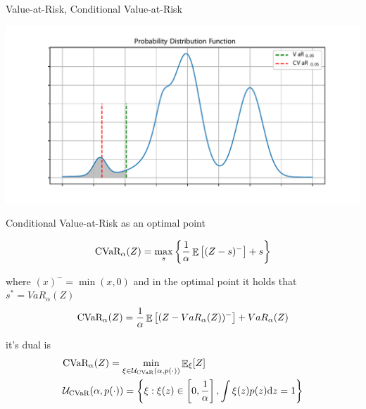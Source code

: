 \documentclass{beamer}
\begin{document}

\begin{frame}{Value-at-Risk, Conditional Value-at-Risk}

\includegraphics[width=\linewidth]{../gfx/pdf.pdf}

\end{frame}


\begin{frame}{Conditional Value-at-Risk as an optimal point}

\begin{definition}
\begin{equation*}
\text{CVaR}_\alpha(Z)= \max_s\left\lbrace \dfrac{1}{\alpha}\mathop{\mathbb{E}} \left[ (Z-s)^-\right] + s  \right\rbrace 
\end{equation*}

where $(x)^- = \min(x, 0)$ and in the optimal point it holds that $s^* = VaR_\alpha(Z)$
\begin{equation*}
\text{CVaR}_\alpha(Z)= \dfrac{1}{\alpha}\mathop{\mathbb{E}} \left[ (Z-VaR_\alpha(Z))^-\right] + VaR_\alpha(Z)
\end{equation*}



it's dual is
\newcommand{\smallenvelope}{\mathcal{U}_{\cvar}(\alpha, p(\cdot))}
\begin{align*}
&\cvar_\alpha(Z)= \min_{\xi \in \smallenvelope}\expect\nolimits_\xi[Z]\\
&\smallenvelope = \braces{\xi : \xi(z) \in \bsquare{0, \frac{1}{\alpha}}, \int \xi(z)p(z) \text{d}z = 1}
\end{align*}
\end{definition}
\end{frame}
\end{document}
